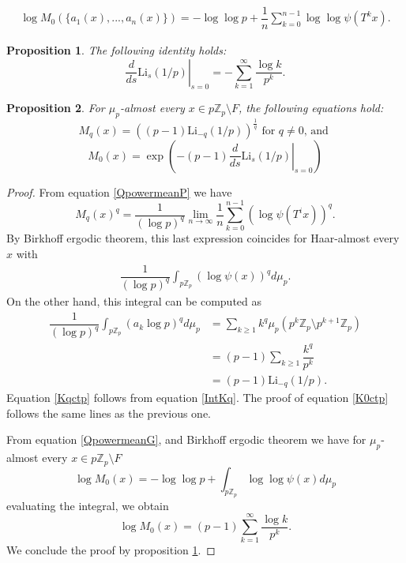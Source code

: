 \documentclass[10pt,a4paper]{amsart}
\newtheorem{proposition}{Proposition}
\newcommand{\Li}{\mathrm{Li}}
\newcommand{\Z}{\mathbb{Z}}
\newcommand{\Zp}{\mathbb{Z}_p}
\begin{document}
\begin{align}\label{QpowermeanG}
    \log M_0(\{a_1(x),...,a_n(x)\})=-\log\log p+\dfrac{1}{n}\sum_{k=0}^{n-1} \log \log \psi (T^{k}x).
\end{align}

\begin{proposition}\label{derivative in zero}
The following identity holds:    
\[\left.\dfrac{d}{ds}\Li_s(1/p)\right|_{s=0}=-\sum_{k=1}^\infty \dfrac{\log k}{p^k}.\]
\end{proposition}

\begin{proposition}\label{PropCalculosHar}
For $\mu_p$-almost every $x\in p\Zp\setminus F$, the following equations hold:
    \begin{equation}\label{Kqctp}
    M_{q}(x)=\left((p-1)\Li_{-q}(1/p)\right)^{\frac{1}{q}} \text{  for $q\neq 0$, and }
    \end{equation} %
    \begin{equation}\label{K0ctp}
    M_{0}(x)=\exp\left(-(p-1)\left.\dfrac{d}{ds}\Li_s(1/p)\right|_{s=0}\right)
    \end{equation}
\end{proposition}

\begin{proof}
    From equation \eqref{QpowermeanP} we have
    \[M_q(x)^q=\dfrac{1}{(\log p)^q}\lim_{n\to \infty}\dfrac{1}{n}\sum_{k=0}^{n-1}(\log \psi (T^ix))^q. \]
    By Birkhoff ergodic theorem, this last expression coincides for Haar-almost every $x$ with
    \begin{align}\label{IntKq}
        \dfrac{1}{(\log p)^q}\int_{p\Z_p} (\log \psi(x))^q d\mu_p.
    \end{align}
    On the other hand, this integral can be computed as 
    \begin{align*}
        \dfrac{1}{(\log p)^q}\int_{p\Z_p} (a_k\log p)^q d\mu_p&=\sum_{k\geq 1}k^q \mu_p \left(p^k\Z_p \setminus p^{k+1}\Z_p \right)\\
        &=(p-1)\sum_{k\geq 1}\dfrac{k^q}{p^k}\\
        &=(p-1)\Li_{-q}(1/p).
    \end{align*}
Equation \eqref{Kqctp} follows from equation \eqref{IntKq}. The proof of equation \eqref{K0ctp} follows the same lines as the previous one.

From equation \eqref{QpowermeanG}, and Birkhoff ergodic theorem we have for $\mu_p$-almost every $x\in p\Z_p\setminus F$
 \[\log M_0(x)=-\log \log p +\int_{p\Z_p} \log \log \psi(x)d\mu_p\]
 evaluating the integral, we obtain
 \[\log M_0(x)=(p-1)\sum_{k=1}^\infty \dfrac{\log k}{p^k}.\]
 We conclude the proof by proposition \ref{derivative in zero}.
\end{proof}
\end{document}

